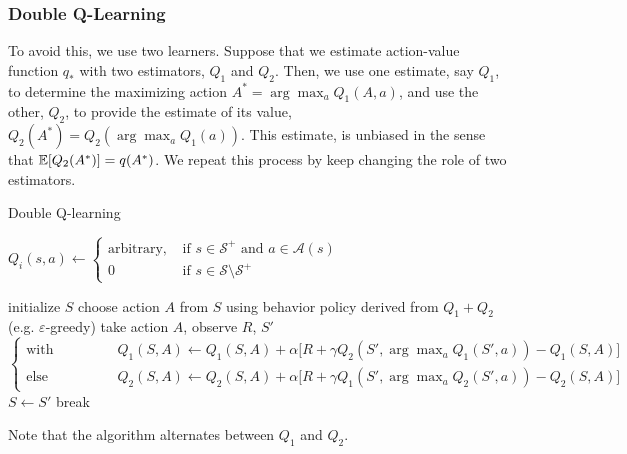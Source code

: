 \documentclass[../../main.tex]{subfiles}
\begin{document}
        \subsubsection{Double Q-Learning}
            To avoid this, we use two learners. Suppose that we estimate action-value function $q_*$ with two estimators, $Q_1$ and $Q_2$.
            Then, we use one estimate, say $Q_1$, to determine the maximizing action $A^* = \arg\max_a Q_1(A,a)$, and use the other, $Q_2$,
            to provide the estimate of its value, $Q_2(A^*)=Q_2(\arg\max_a Q_1(a))$. This estimate, is unbiased in the sense that $\mathbb{E}[Q_2(A^*)]=q(A^*)$.
            We repeat this process by keep changing the role of two estimators.

            {Double Q-learning}
            {\inputitem{$\alpha \in (0,1]$}{step size parameter}}
            {}
            {
                {
                    {$Q_i(s,a) \leftarrow
                    \begin{cases}
                        \text{arbitrary,} &\text{ if $s \in \mathcal{S}^+$ and $a \in \mathcal{A}(s)$} \\
                        0 &\text{ if $s \in \mathcal{S} \setminus \mathcal{S}^+$}
                    \end{cases}$\;}
                }

                {
                    initialize $S$\;
                    {
                        choose action $A$ from $S$ using behavior policy derived from $Q_1 + Q_2$ (e.g. $\varepsilon$-greedy)\;
                        take action $A$, observe $R$, $S'$\;
                        $
                        \begin{cases}
                            \text{with probability 0.5} &Q_1(S,A) \leftarrow Q_1(S,A) + \alpha \big[ R + \gamma Q_2(S', \arg\max_a{Q_1(S',a)}) - Q_1(S,A) \big] \\
                            \text{else} &Q_2(S,A) \leftarrow Q_2(S,A) + \alpha \big[ R + \gamma Q_1(S', \arg\max_a{Q_2(S',a)}) - Q_2(S,A) \big]
                        \end{cases}
                        $\;
                        $S \leftarrow S'$\;
                        {
                            break
                        }
                    }
                }
            }
            Note that the algorithm alternates between $Q_1$ and $Q_2$.
\end{document}
